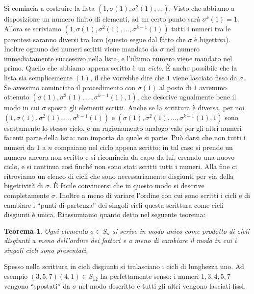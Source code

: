 \documentclass[11pt]{article}
\theoremstyle{plain}
\newtheorem{thm}{Teorema}[section]
\theoremstyle{definition}
\theoremstyle{remark}
\begin{document}
Si comincia a costruire la lista $(1, \sigma(1), \sigma^2(1), \dots)$. Visto che abbiamo a disposizione un numero finito di elementi,
ad un certo punto sarà $\sigma^k(1) = 1$. Allora se scriviamo $(1, \sigma(1), \sigma^2(1), \dots, \sigma^{k-1}(1))$ tutti i numeri tra le 
parentesi saranno diversi tra loro (questo segue dal fatto che $\sigma$ è bigettiva). Inoltre ognuno dei numeri scritti viene mandato da $\sigma$
nel numero immediatamente successivo nella lista, e l'ultimo numero viene mandato nel primo. Quello che abbiamo appena scritto è un \emph{ciclo}.
\`E anche possibile che la lista sia semplicemente $(1)$, il che vorrebbe dire che $1$ viene lasciato fisso da $\sigma$.
Se avessimo cominciato il procedimento con $\sigma(1)$ al posto di $1$ avremmo ottenuto $(\sigma(1), \sigma^2(1), \dots, \sigma^{k-1}(1), 1)$, che
descrive ugualmente bene il modo in cui $\sigma$ sposta gli elementi scritti. Anche se la scrittura è diversa, per noi
$(1, \sigma(1), \sigma^2(1), \dots, \sigma^{k-1}(1))$ e $(\sigma(1), \sigma^2(1), \dots, \sigma^{k-1}(1), 1)$ sono esattamente lo stesso ciclo,
e un ragionamento analogo vale per gli altri numeri facenti parte della lista: non importa da quale si parte.
Può darsi che non tutti i numeri da $1$ a $n$ compaiano nel ciclo appena scritto: in tal caso si prende un numero ancora non scritto e si ricomincia da capo
da lui, creando una nuovo ciclo, e si continua così finché non sono stati scritti tutti i numeri.
Alla fine ci ritroviamo un elenco di cicli che sono necessariamente disgiunti per via della bigettività di $\sigma$.
\`E facile convincersi che in questo modo si descrive completamente $\sigma$. Inoltre a meno di variare
l'ordine con cui sono scritti i cicli e di cambiare i ``punti di partenza'' dei singoli cicli questa scrittura come cicli disgiunti è unica.
Riassumiamo quanto detto nel seguente teorema:

\begin{thm}
Ogni elemento $\sigma \in S_n$ si scrive in modo unico come prodotto di cicli disgiunti a meno dell'ordine dei fattori e a meno di 
cambiare il modo in cui i singoli cicli sono presentati.
\end{thm}

Spesso nella scrittura in cicli disgiunti si tralasciano i cicli di lunghezza uno. Ad esempio $(3,5,7)(4,1)\in S_{12}$ ha perfettamente senso:
i numeri $1,3,4,5,7$ vengono ``spostati'' da $\sigma$ nel modo descritto e tutti gli altri vengono lasciati fissi.
\end{document}
